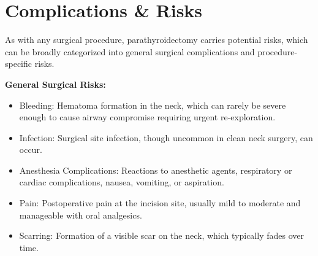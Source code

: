 \section*{Complications \& Risks}
As with any surgical procedure, parathyroidectomy carries potential risks, which can be broadly categorized into general surgical complications and procedure-specific risks.

\textbf{General Surgical Risks:}
\begin{itemize}
  \item Bleeding: Hematoma formation in the neck, which can rarely be severe enough to cause airway compromise requiring urgent re-exploration.
  \item Infection: Surgical site infection, though uncommon in clean neck surgery, can occur.
  \item Anesthesia Complications: Reactions to anesthetic agents, respiratory or cardiac complications, nausea, vomiting, or aspiration.
  \item Pain: Postoperative pain at the incision site, usually mild to moderate and manageable with oral analgesics.
  \item Scarring: Formation of a visible scar on the neck, which typically fades over time.
\end{itemize}

